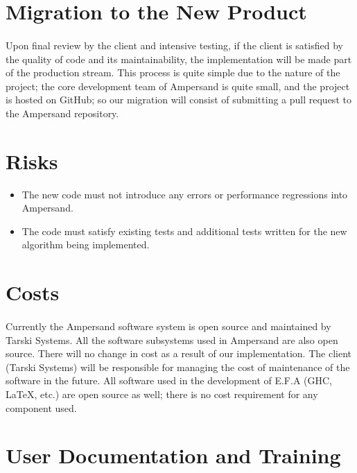 \documentclass[12pt]{report}
\begin{document}
\section{Migration to the New Product}\label{sec:Migration}
\paragraph*{}
Upon final review by the client and intensive testing, if the client is
satisfied by the quality of code and its maintainability, the implementation
will be made part of the production stream.  This process is quite simple due to
the nature of the project; the core development team of Ampersand is quite
small, and the project is hosted on GitHub; so our migration will consist of
submitting a pull request to the Ampersand repository.
\section{Risks}\label{sec:Risks}
\begin{itemize}
\item The new code must not introduce any 
errors or performance regressions
into Ampersand.
\item The code must satisfy existing tests and 
additional tests written for the new algorithm being implemented.
\end{itemize}

\section{Costs}\label{sec:Costs}
\paragraph*{}
Currently the Ampersand software system is open source and maintained by Tarski
Systems.  All the software subsystems used in Ampersand are also open
source. There will no change in cost as a result of our implementation. The
client (Tarski Systems) will be responsible for managing the cost of
maintenance of the software in the future. All software used in the development
of E.F.A (GHC, LaTeX, etc.) are open source as well; there is no cost
requirement for any component used.
\section{User Documentation and Training}\label{sec:UserDoc}
\end{document}
